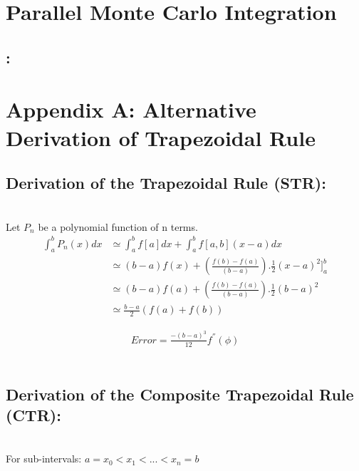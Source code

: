 \documentclass[11pt]{article}
\begin{document}
\begin{page}
\section{Parallel Monte Carlo Integration}
\subsection{:} 


\section{Appendix A: Alternative Derivation of Trapezoidal Rule}
\subsection{Derivation of the Trapezoidal Rule (STR):}\\
\noindent Let $P_n$ be a polynomial function of n terms.\\

\begin{equation}
\begin{aligned}
    \int_{a}^{b} P_n(x) dx &\simeq{} \int_{a}^{b} f[a]dx + \int_{a}^{b} f[a,b](x-a)dx\\
    &\simeq{} (b-a)f(x) + (\frac{f(b)-f(a)}{(b-a)}).\frac{1}{2}(x-a)^{2}]_{a}^{b}\\
    &\simeq{} (b-a)f(a) + (\frac{f(b)-f(a)}{(b-a)}).\frac{1}{2}(b-a)^{2}\\
    &\simeq{} \frac{b-a}{2}(f(a)+f(b))
\end{aligned}
\end{equation}

\begin{equation}
\begin{aligned}
    Error = \frac{-(b-a)^{3}}{12}f^{''}(\phi)
\end{aligned}
\end{equation} 
\\

\subsection{Derivation of the Composite Trapezoidal Rule (CTR):}\\
\noindent For sub-intervals: $a = x_0 < x_1 < ... < x_n = b$
\\


\end{page}
\end{document}
